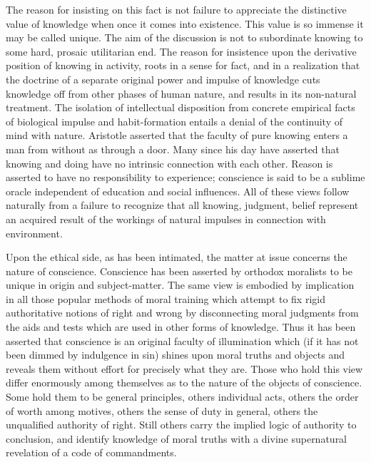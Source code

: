 \documentclass[12pt]{article}
\begin{document}
The reason for insisting on this fact is not failure
to appreciate the distinctive value of knowledge when
once it comes into existence. This value is so immense
it may be called unique. The aim of the discussion is
not to subordinate knowing to some hard, prosaic utilitarian
end. The reason for insistence upon the derivative
position of knowing in activity, roots in a sense for
fact, and in a realization that the doctrine of a separate
original power and impulse of knowledge cuts
knowledge off from other phases of human nature, and
results in its non-natural treatment. The isolation of
intellectual disposition from concrete empirical facts
of biological impulse and habit-formation entails a denial
of the continuity of mind with nature. Aristotle
asserted that the faculty of pure knowing enters a man
from without as through a door. Many since his day
have asserted that knowing and doing have no intrinsic
connection with each other. Reason is asserted to have
no responsibility to experience; conscience is said to be
a sublime oracle independent of education and social influences.
All of these views follow naturally from a
failure to recognize that all knowing, judgment, belief
represent an acquired result of the workings of natural
impulses in connection with environment.

Upon the ethical side, as has been intimated, the matter
at issue concerns the nature of conscience. Conscience
has been asserted by orthodox moralists to be
unique in origin and subject-matter. The same view is
embodied by implication in all those popular methods
of moral training which attempt to fix rigid authoritative
notions of right and wrong by disconnecting moral
judgments from the aids and tests which are used in
other forms of knowledge. Thus it has been asserted
that conscience is an original faculty of illumination
which (if it has not been dimmed by indulgence in sin)
shines upon moral truths and objects and reveals them
without effort for precisely what they are. Those who
hold this view differ enormously among themselves as
to the nature of the objects of conscience. Some hold
them to be general principles, others individual acts,
others the order of worth among motives, others the
sense of duty in general, others the unqualified authority
of right. Still others carry the implied logic of
authority to conclusion, and identify knowledge of
moral truths with a divine supernatural revelation of a
code of commandments.
\end{document}
